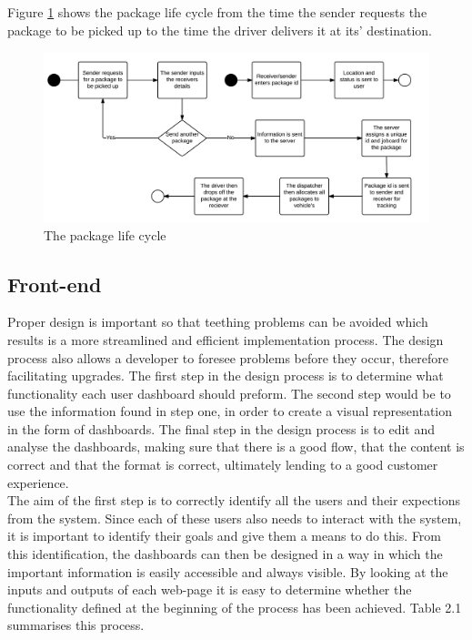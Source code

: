 \documentclass[paper=a4, fontsize=11pt]{scrartcl} %
\numberwithin{equation}{section} %
\numberwithin{figure}{section} %
\numberwithin{table}{section} %
\begin{document}
Figure \ref{PackageLifeCycle} shows the package life cycle from the time the sender requests the package to be picked up to the time the driver delivers it at its' destination.

\begin{figure}[hbt!]
\centering
\includegraphics[width=5in]{pictures/package.png}
\caption{The package life cycle}
\label{PackageLifeCycle}
\end{figure}


\subsection{Front-end}
Proper design is important so that teething problems can be avoided which results is a more streamlined and efficient implementation process. The design process also allows a developer to foresee problems before they occur, therefore facilitating upgrades. The first step in the design process is to determine what functionality each user dashboard should preform. The second step would be to use the information found in step one, in order to create a visual representation in the form of dashboards. The final step in the design process is to edit and analyse the dashboards, making sure that there is a good flow, that the content is correct and that the format is correct, ultimately lending to a good customer experience.
\\

The aim of the first step is to correctly identify all the users and their expections from the system. Since each of these users also needs to interact with the system, it is important to identify their goals and give them a means to do this. From this identification, the dashboards can then be designed in a way in which the important information is easily accessible and always visible. By looking at the inputs and outputs of each web-page it is easy to determine whether the functionality defined at the beginning of the process has been achieved.
Table 2.1 summarises this process.
\\
\end{document}

